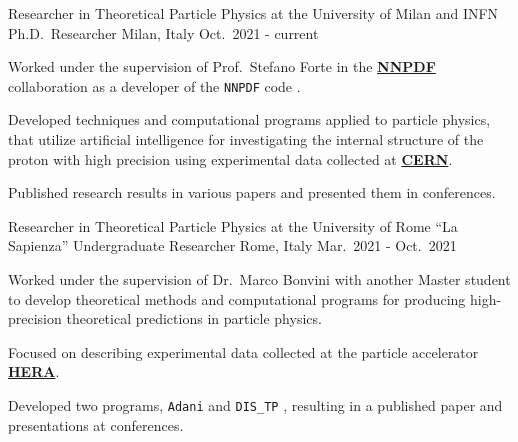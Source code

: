 

\begin{cventries}

  \cventry
  {Researcher in Theoretical Particle Physics at the University of Milan and INFN}
  {Ph.D.\ Researcher}
  {Milan, Italy}
  {Oct.\ 2021 - current}
  {
      \begin{cvitems} %
          \item Worked under the supervision of Prof.\ Stefano Forte in the \href{https://nnpdf.mi.infn.it}{\textbf{NNPDF}} collaboration 
          as a developer of the \texttt{NNPDF} code \href{https://github.com/NNPDF}{\githublogo}.
          \item Developed techniques and computational programs applied to particle physics, that utilize artificial intelligence for 
          investigating the internal structure of the proton with high precision using experimental data collected at \href{https://home.cern}{\textbf{CERN}}.
          \item Published research results in various papers and presented them in conferences.
      \end{cvitems}
    }

    \cventry
{Researcher in Theoretical Particle Physics at the University of Rome ``La Sapienza''}
{Undergraduate Researcher}
{Rome, Italy}
{Mar.\ 2021 - Oct.\ 2021}
{
      \begin{cvitems} %
        \item Worked under the supervision of Dr.\ Marco Bonvini with another Master student to develop theoretical methods and computational programs for producing high-precision theoretical predictions in particle physics.
        \item Focused on describing experimental data collected at the particle accelerator \href{https://en.wikipedia.org/wiki/HERA_(particle_accelerator)}{\textbf{HERA}}.
        \item Developed two programs, \texttt{Adani} \href{https://github.com/niclaurenti/adani}{\githublogo} and \texttt{DIS\_TP} \href{https://github.com/andreab1997/DIS_TP}{\githublogo}, resulting in a published paper and presentations at conferences.
      \end{cvitems}
    }


\end{cventries}